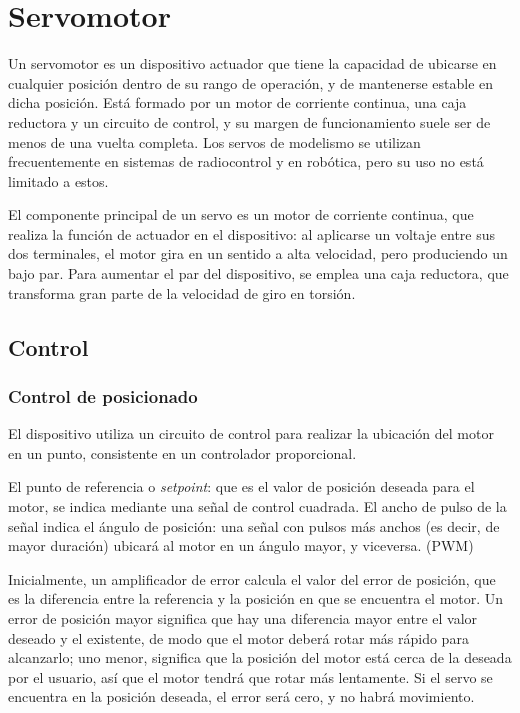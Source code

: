 \documentclass[../main]{subfiles}
\begin{document}
\chapter{Servomotor}
Un servomotor es un dispositivo actuador que tiene la capacidad de
ubicarse en cualquier posición dentro de su rango de operación, y de
mantenerse estable en dicha posición. Está formado por un motor de
corriente continua, una caja reductora y un circuito de control, y su
margen de funcionamiento suele ser de menos de una vuelta completa.
Los servos de modelismo se utilizan frecuentemente en sistemas de
radiocontrol y en robótica, pero su uso no está limitado a estos.

El componente principal de un servo es un motor de corriente
continua, que realiza la función de actuador en el dispositivo: al
aplicarse un voltaje entre sus dos terminales, el motor gira en un
sentido a alta velocidad, pero produciendo un bajo par. Para aumentar
el par del dispositivo, se emplea una caja reductora, que transforma
gran parte de la velocidad de giro en torsión.

\section{Control}
\subsection{Control de posicionado}


El dispositivo utiliza un circuito de control para realizar la
ubicación del motor en un punto, consistente en un controlador proporcional.

El punto de referencia o \emph{setpoint}: que es el valor de posición
deseada para el motor, se indica mediante una señal de control
cuadrada. El ancho de pulso de la señal indica el ángulo de posición:
una señal con pulsos más anchos (es decir, de mayor duración) ubicará
al motor en un ángulo mayor, y viceversa. (PWM)

Inicialmente, un amplificador de error calcula el valor del error de
posición, que es la diferencia entre la referencia y la posición en
que se encuentra el motor. Un error de posición mayor significa que
hay una diferencia mayor entre el valor deseado y el existente, de
modo que el motor deberá rotar más rápido para alcanzarlo; uno menor,
significa que la posición del motor está cerca de la deseada por el
usuario, así que el motor tendrá que rotar más lentamente. Si el
servo se encuentra en la posición deseada, el error será cero, y no
habrá movimiento.
\end{document}
